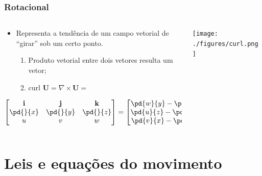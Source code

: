 \begin{frame}
\frametitle{Rotacional}

  \begin{columns}
    \begin{column}{0.5\textwidth}
        \begin{itemize}[<+-| alert@+>]
          \item Representa a tendência de um campo vetorial de ``girar'' sob um
                certo ponto.
            \begin{enumerate}[<+-| alert@+>]
              \item Produto vetorial entre dois vetores resulta um vetor;
              \item $\text{curl } \mathbf{U} = \nabla \times \mathbf{U} = $
            \end{enumerate}
        \end{itemize}  \pause
                \begin{equation*}
                  \begin{bmatrix}
                    \mathbf{i} & \mathbf{j} & \mathbf{k}\\
                    \pd{}{x} & \pd{}{y} & \pd{}{z}\\
                    u & v & w
                  \end{bmatrix} =
                  \begin{bmatrix}
                    \pd{w}{y} - \pd{v}{z}\\
                    \pd{u}{z} - \pd{w}{x}\\
                    \pd{v}{x} - \pd{u}{y}
                  \end{bmatrix}
                \end{equation*}
    \end{column}
    \pause
    \begin{column}{0.5\textwidth}
      \begin{center}
        \texttt{[image: ./figures/curl.png]}
      \end{center}
    \end{column}
  \end{columns}

\end{frame}

\section{Leis e equações do movimento}

